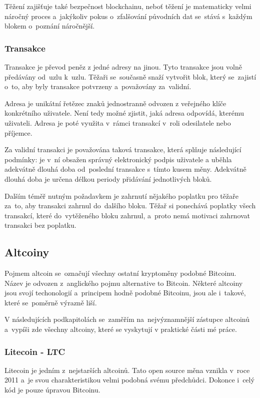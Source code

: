 \documentclass[thesis=B,czech]{FITthesis}[2019/03/21]
\begin{document}
Těžení zajišťuje také bezpečnost blockchainu, neboť těžení je matematicky velmi náročný proces a~jakýkoliv pokus o~zfalšování původních dat se~stává s~každým blokem o~poznání náročnější. \cite{mastering_bitcoin}

\subsubsection{Transakce}
Transakce je převod peněz z jedné adresy na jinou. Tyto transakce jsou volně předávány od~uzlu k~uzlu. Těžaři se~současně snaží vytvořit blok, který se~zajistí o~to, aby byly transakce potvrzeny a~považovány za~validní.

Adresa je unikátní řetězec znaků jednostranně odvozen z veřejného klíče konkrétního uživatele. Není tedy možné zjistit, jaká adresa odpovídá, kterému uživateli. Adresa je poté využita v~rámci transakcí v~roli odesilatele nebo příjemce. \cite{mastering_bitcoin}

Za validní transakci je považována taková transakce, která splňuje \linebreak následující podmínky: je v~ní obsažen správný elektronický podpis uživatele a uběhla adekvátně dlouhá doba od~poslední transakce s~tímto kusem měny. Adekvátně dlouhá doba je určena délkou periody přidávání jednotlivých bloků. \cite{Finex_blockchain}

Dalším téměř nutným požadavkem je zahrnutí nějakého poplatku pro těžaře za~to, aby transakci zahrnul do~dalšího bloku. Těžař si ponechává poplatky všech transakcí, které do~vytěženého bloku zahrnul, a~proto nemá motivaci zahrnovat transakci bez poplatku. \cite{Finex_blockchain}

\subsection{Altcoiny}
Pojmem altcoin se~označují všechny ostatní kryptoměny podobné Bitcoinu. Název je odvozen z~anglického pojmu alternative to Bitcoin. Některé altcoiny jsou svojí techonologií a~principem hodně podobné Bitcoinu, jsou ale i~takové, které se~poměrně výrazně liší. \cite{pecev}

V následujících podkapitolách se~zaměřím na~nejvýznamnější zástupce altcoinů a~vypíši zde všechny altcoiny, které se vyskytují v praktické části mé práce.

\subsubsection{Litecoin - LTC}
Litecoin je jedním z~nejstarších altcoinů. Tato open source měna vznikla v~roce 2011 a~je svou charakteristikou velmi podobná svému předchůdci. \cite{litecoin} Dokonce i~celý kód je pouze úpravou Bitcoinu. \cite{alza_monero}
\end{document}
